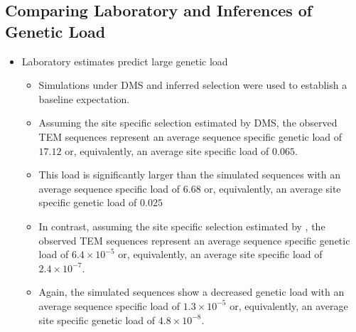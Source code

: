 \documentclass[12pt]{article}
\begin{document}
\subsection*{Comparing Laboratory and \selac Inferences of Genetic Load}
\begin{itemize}
	\item Laboratory estimates predict large genetic load
	\begin{itemize}
		\item Simulations under DMS and \selac inferred selection were used to establish a baseline expectation.
		\item Assuming the site specific selection estimated by DMS, the observed TEM sequences represent an average sequence specific genetic load of $17.12$ or, equivalently, an average site specific load of $0.065$.
		\item This load is significantly larger than the simulated sequences with an average sequence specific load of $6.68$ or, equivalently, an average site specific genetic load of $0.025$
		\item In contrast, assuming the site specific selection estimated by \selac, the observed TEM sequences represent an average sequence specific genetic load of $6.4\times10^{-5}$ or, equivalently, an average site specific load of $2.4\times10^{-7}$.
		\item Again, the simulated sequences show a decreased genetic load with an average sequence specific load of $1.3\times10^{-5}$ or, equivalently, an average site specific genetic load of $4.8\times10^{-8}$.
	\end{itemize}
\end{itemize}
\end{document}
